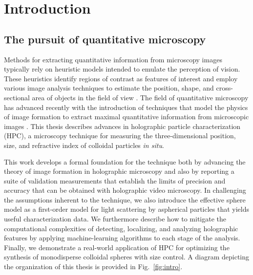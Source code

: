 \chapter{Introduction}
\label{ch:intro}






\section{The pursuit of quantitative microscopy}

Methods for extracting quantitative information from microscopy
images typically rely on heuristic models intended to emulate
the perception of vision.
These heuristics identify regions of contrast as features
of interest and employ various image analysis techniques to estimate
the position, shape, and cross-sectional area of objects in the
field of view \cite{jahne97,gonzalez06,castleman96,pratt16,jain89}.
The field of quantitative microscopy has advanced recently with the
introduction of techniques that model the physics of image formation
to extract maximal quantitative information
from microscopic images \cite{lee07,bierbaum2017}.
This thesis describes advances in holographic particle characterization (HPC),
a microscopy technique for measuring
the three-dimensional position, size, and refractive index of
colloidal particles \emph{in situ}.

This work develops a formal foundation for the technique both by
advancing the theory of image formation in holographic microscopy
and also by reporting a suite of validation measurements
that establish the limits of precision and accuracy that can be
obtained with holographic video microscopy. In challenging
the assumptions inherent to the technique, we also introduce the
effective sphere model as a first-order model for
light scattering by aspherical particles that yields useful
characterization data.
We furthermore describe how to mitigate the computational complexities
of detecting, localizing, and analyzing holographic features by
applying machine-learning algorithms to each stage of the analysis.
Finally, we demonstrate a real-world application
of HPC for optimizing the synthesis of monodisperse
colloidal spheres with size control. A diagram depicting the organization
of this thesis is provided in Fig.~\ref{fig:intro}.

